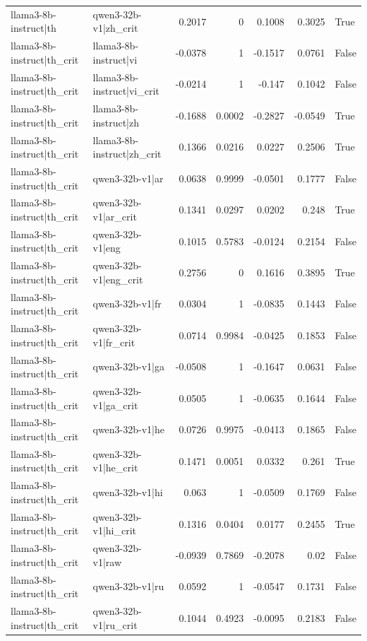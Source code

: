 \begin{table}
\begin{tabular}{l l r r r r l}
llama3-8b-instruct|th & qwen3-32b-v1|zh_crit & 0.2017 & 0 & 0.1008 & 0.3025 & True \\
llama3-8b-instruct|th_crit & llama3-8b-instruct|vi & -0.0378 & 1 & -0.1517 & 0.0761 & False \\
llama3-8b-instruct|th_crit & llama3-8b-instruct|vi_crit & -0.0214 & 1 & -0.147 & 0.1042 & False \\
llama3-8b-instruct|th_crit & llama3-8b-instruct|zh & -0.1688 & 0.0002 & -0.2827 & -0.0549 & True \\
llama3-8b-instruct|th_crit & llama3-8b-instruct|zh_crit & 0.1366 & 0.0216 & 0.0227 & 0.2506 & True \\
llama3-8b-instruct|th_crit & qwen3-32b-v1|ar & 0.0638 & 0.9999 & -0.0501 & 0.1777 & False \\
llama3-8b-instruct|th_crit & qwen3-32b-v1|ar_crit & 0.1341 & 0.0297 & 0.0202 & 0.248 & True \\
llama3-8b-instruct|th_crit & qwen3-32b-v1|eng & 0.1015 & 0.5783 & -0.0124 & 0.2154 & False \\
llama3-8b-instruct|th_crit & qwen3-32b-v1|eng_crit & 0.2756 & 0 & 0.1616 & 0.3895 & True \\
llama3-8b-instruct|th_crit & qwen3-32b-v1|fr & 0.0304 & 1 & -0.0835 & 0.1443 & False \\
llama3-8b-instruct|th_crit & qwen3-32b-v1|fr_crit & 0.0714 & 0.9984 & -0.0425 & 0.1853 & False \\
llama3-8b-instruct|th_crit & qwen3-32b-v1|ga & -0.0508 & 1 & -0.1647 & 0.0631 & False \\
llama3-8b-instruct|th_crit & qwen3-32b-v1|ga_crit & 0.0505 & 1 & -0.0635 & 0.1644 & False \\
llama3-8b-instruct|th_crit & qwen3-32b-v1|he & 0.0726 & 0.9975 & -0.0413 & 0.1865 & False \\
llama3-8b-instruct|th_crit & qwen3-32b-v1|he_crit & 0.1471 & 0.0051 & 0.0332 & 0.261 & True \\
llama3-8b-instruct|th_crit & qwen3-32b-v1|hi & 0.063 & 1 & -0.0509 & 0.1769 & False \\
llama3-8b-instruct|th_crit & qwen3-32b-v1|hi_crit & 0.1316 & 0.0404 & 0.0177 & 0.2455 & True \\
llama3-8b-instruct|th_crit & qwen3-32b-v1|raw & -0.0939 & 0.7869 & -0.2078 & 0.02 & False \\
llama3-8b-instruct|th_crit & qwen3-32b-v1|ru & 0.0592 & 1 & -0.0547 & 0.1731 & False \\
llama3-8b-instruct|th_crit & qwen3-32b-v1|ru_crit & 0.1044 & 0.4923 & -0.0095 & 0.2183 & False \\

\end{tabular}
\end{table}
